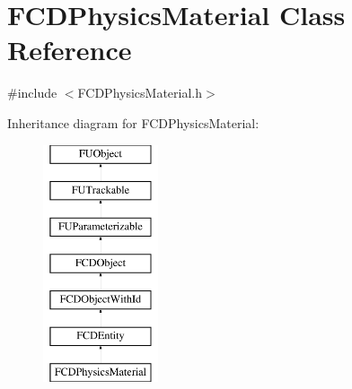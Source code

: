 \hypertarget{classFCDPhysicsMaterial}{
\section{FCDPhysicsMaterial Class Reference}
\label{classFCDPhysicsMaterial}
}


{\ttfamily \#include $<$FCDPhysicsMaterial.h$>$}

Inheritance diagram for FCDPhysicsMaterial:\begin{figure}[H]
\begin{center}
\leavevmode
\includegraphics[height=7.000000cm]{classFCDPhysicsMaterial}
\end{center}
\end{figure}
